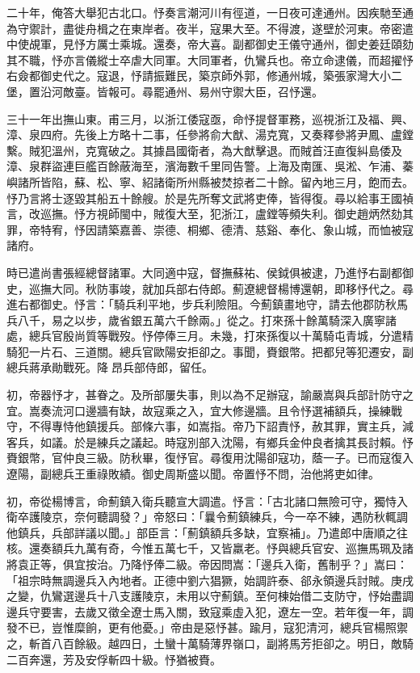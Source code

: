 \begin{pinyinscope}
二十年，俺答大舉犯古北口。忬奏言潮河川有徑道，一日夜可達通州。因疾馳至通為守禦計，盡徙舟楫之在東岸者。夜半，寇果大至。不得渡，遂壁於河東。帝密遣中使覘軍，見忬方厲士乘城。還奏，帝大喜。副都御史王儀守通州，御史姜廷頤劾其不職，忬亦言儀縱士卒虐大同軍。大同軍者，仇鸞兵也。帝立命逮儀，而超擢忬右僉都御史代之。寇退，忬請振難民，築京師外郭，修通州城，築張家灣大小二堡，置沿河敵臺。皆報可。尋罷通州、易州守禦大臣，召忬還。

三十一年出撫山東。甫三月，以浙江倭寇亟，命忬提督軍務，巡視浙江及福、興、漳、泉四府。先後上方略十二事，任參將俞大猷、湯克寬，又奏釋參將尹鳳、盧鏜繫。賊犯溫州，克寬破之。其據昌國衛者，為大猷擊退。而賊首汪直復糾島倭及漳、泉群盜連巨艦百餘蔽海至，濱海數千里同告警。上海及南匯、吳淞、乍浦、蓁嶼諸所皆陷，蘇、松、寧、紹諸衛所州縣被焚掠者二十餘。留內地三月，飽而去。忬乃言將士逐毀其船五十餘艘。於是先所奪文武將吏俸，皆得復。尋以給事王國禎言，改巡撫。忬方視師閩中，賊復大至，犯浙江，盧鏜等頻失利。御史趙炳然劾其罪，帝特宥，忬因請築嘉善、崇德、桐鄉、德清、慈谿、奉化、象山城，而恤被寇諸府。

時已遣尚書張經總督諸軍。大同適中寇，督撫蘇祐、侯鉞俱被逮，乃進忬右副都御史，巡撫大同。秋防事竣，就加兵部右侍郎。薊遼總督楊博還朝，即移忬代之。尋進右都御史。忬言：「騎兵利平地，步兵利險阻。今薊鎮畫地守，請去他郡防秋馬兵八千，易之以步，歲省銀五萬六千餘兩。」從之。打來孫十餘萬騎深入廣寧諸處，總兵官殷尚質等戰歿。忬停俸三月。未幾，打來孫復以十萬騎屯青城，分遣精騎犯一片石、三道關。總兵官歐陽安拒卻之。事聞，賚銀幣。把都兒等犯遷安，副總兵蔣承勛戰死。降昂兵部侍郎，留任。

初，帝器忬才，甚眷之。及所部屢失事，則以為不足辦寇，諭嚴嵩與兵部計防守之宜。嵩奏流河口邊牆有缺，故寇乘之入，宜大修邊牆。且令忬選補額兵，操練戰守，不得專恃他鎮援兵。部條六事，如嵩指。帝乃下詔責忬，赦其罪，實主兵，減客兵，如議。於是練兵之議起。時寇別部入沈陽，有鄉兵金仲良者擒其長討賴。忬賚銀幣，官仲良三級。防秋畢，復忬官。尋復用沈陽卻寇功，蔭一子。已而寇復入遼陽，副總兵王重祿敗績。御史周斯盛以聞。帝置忬不問，治他將吏如律。

初，帝從楊博言，命薊鎮入衛兵聽宣大調遣。忬言：「古北諸口無險可守，獨恃入衛卒護陵京，奈何聽調發？」帝怒曰：「曩令薊鎮練兵，今一卒不練，遇防秋輒調他鎮兵，兵部詳議以聞。」部臣言：「薊鎮額兵多缺，宜察補」。乃遣郎中唐順之往核。還奏額兵九萬有奇，今惟五萬七千，又皆羸老。忬與總兵官安、巡撫馬珮及諸將袁正等，俱宜按治。乃降忬俸二級。帝因問嵩：「邊兵入衛，舊制乎？」嵩曰：「祖宗時無調邊兵入內地者。正德中劉六猖獗，始調許泰、郤永領邊兵討賊。庚戌之變，仇鸞選邊兵十八支護陵京，未用以守薊鎮。至何棟始借二支防守，忬始盡調邊兵守要害，去歲又徵全遼士馬入關，致寇乘虛入犯，遼左一空。若年復一年，調發不已，豈惟糜餉，更有他憂。」帝由是惡忬甚。踰月，寇犯清河，總兵官楊照禦之，斬首八百餘級。越四日，土蠻十萬騎薄界嶺口，副將馬芳拒卻之。明日，敵騎二百奔還，芳及安俘斬四十級。忬猶被賚。


\end{pinyinscope}
